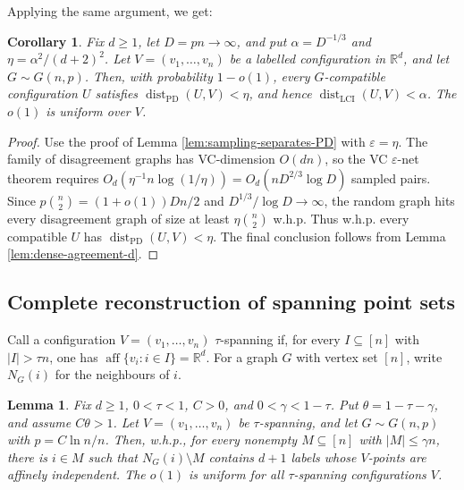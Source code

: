 \documentclass[fullpage,11pt]{article}
\newcommand{\R}{\mathbb{R}}
\newcommand{\LCI}{\mathrm{LCI}}
\newcommand{\PD}{\mathrm{PD}}
\providecommand{\dist}{\operatorname{dist}}
\providecommand{\aff}{\operatorname{aff}}
\theoremstyle{break}
\newtheorem{lemma}[theorem]{Lemma}
\newtheorem{corollary}[theorem]{Corollary}
\theoremstyle{definition}
\theoremstyle{break}
\begin{document}
Applying the same argument, we get:

\begin{corollary}\label{cor:variable-scale-PD-separation}
Fix \(d\ge1\), let \(D=pn\to\infty\), and put
\(\alpha=D^{-1/3}\) and \(\eta=\alpha^2/(d+2)^2\). Let
\(V=(v_1,\ldots,v_n)\) be a labelled configuration in \(\mathbb R^d\), and
let \(G\sim G(n,p)\). Then, with probability \(1-o(1)\), every
\(G\)-compatible configuration \(U\) satisfies
\(\dist_{\PD}(U,V)<\eta\), and hence \(\dist_{\LCI}(U,V)<\alpha\). The
\(o(1)\) is uniform over \(V\).
\end{corollary}

\begin{proof}
Use the proof of Lemma \ref{lem:sampling-separates-PD} with
\(\varepsilon=\eta\). The family of disagreement graphs has VC-dimension
\(O(dn)\), so the VC \(\varepsilon\)-net theorem requires
\(O_d(\eta^{-1}n\log(1/\eta))=O_d(nD^{2/3}\log D)\) sampled pairs. Since
\(p\binom n2=(1+o(1))Dn/2\) and \(D^{1/3}/\log D\to\infty\), the random
graph hits every disagreement graph of size at least \(\eta\binom n2\) w.h.p.
Thus w.h.p. every compatible \(U\) has \(\dist_{\PD}(U,V)<\eta\). The final
conclusion follows from Lemma \ref{lem:dense-agreement-d}.
\end{proof}


\subsection{Complete reconstruction of spanning point sets}

Call a configuration \(V=(v_1,\ldots,v_n)\) \(\tau\)-spanning if, for every
\(I\subseteq[n]\) with \(|I|>\tau n\), one has
\(\aff\{v_i:i\in I\}=\R^d\). For a graph \(G\) with vertex set \([n]\), write
\(N_G(i)\) for the neighbours of \(i\).

\begin{lemma}\label{lem:no-small-anchor-closed-sets}
Fix \(d\ge1\), \(0<\tau<1\), \(C>0\), and \(0<\gamma<1-\tau\). Put
\(\theta=1-\tau-\gamma\), and assume \(C\theta>1\). Let
\(V=(v_1,\ldots,v_n)\) be \(\tau\)-spanning, and let \(G\sim G(n,p)\) with
\(p=C\ln n/n\). Then, w.h.p., for every nonempty \(M\subseteq[n]\) with
\(|M|\le\gamma n\), there is \(i\in M\) such that \(N_G(i)\setminus M\)
contains \(d+1\) labels whose \(V\)-points are affinely independent. The
\(o(1)\) is uniform for all \(\tau\)-spanning configurations \(V\).
\end{lemma}
\end{document}
